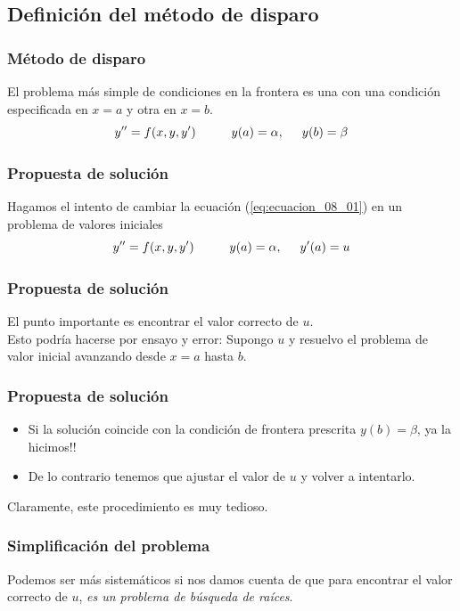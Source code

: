 \subsection{Definición del método de disparo}
\begin{frame}
\frametitle{Método de disparo}
El problema más simple de condiciones en la frontera es una  con una condición especificada en $x = a$ y otra en $x = b$.
\begin{equation}
y^{\prime \prime} = f(x, y, y^{\prime}) \hspace{1cm} y(a) = \alpha, \hspace{0.5cm} y(b) = \beta
\label{eq:ecuacion_08_01}
\end{equation}
\end{frame}
\begin{frame}
\frametitle{Propuesta de solución}
Hagamos el intento de cambiar la ecuación (\ref{eq:ecuacion_08_01}) en un problema de valores iniciales
\begin{equation}
y^{\prime \prime} = f(x, y, y^{\prime}) \hspace{1cm} y(a) = \alpha, \hspace{0.5cm} y^{\prime}(a) = u
\label{eq:ecuacion_08_02}
\end{equation}
\end{frame}
\begin{frame}
\frametitle{Propuesta de solución}
El punto importante es encontrar el valor correcto de $u$.
\\
\bigskip
Esto podría hacerse por ensayo y error: Supongo $u$ y resuelvo el problema de valor inicial avanzando desde $x = a$ hasta $b$.
\end{frame}
\begin{frame}
\frametitle{Propuesta de solución}
\begin{itemize}[<+->]
\item Si la solución coincide con la condición de frontera prescrita $y(b) = \beta$, ya la hicimos!!
\item De lo contrario tenemos que ajustar el valor de $u$ y volver a intentarlo.
\end{itemize}
\pause
Claramente, este procedimiento es muy tedioso.
\end{frame}
\begin{frame}
\frametitle{Simplificación del problema}
Podemos ser más sistemáticos si nos damos cuenta de que para encontrar el valor correcto de $u$, \emph{es un problema de búsqueda de raíces}.
\end{frame}
